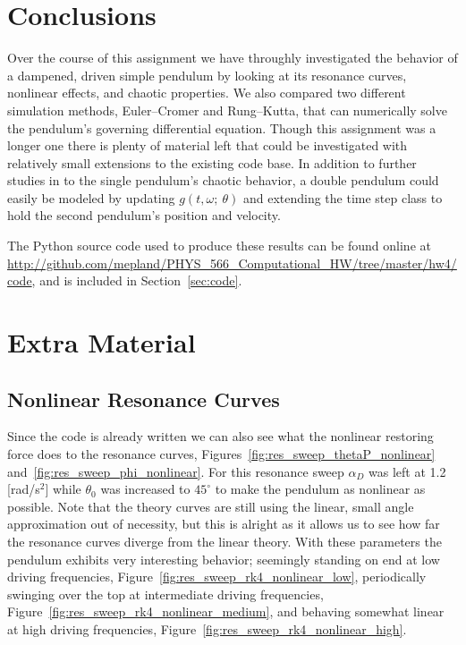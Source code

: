 \documentclass[notitlepage,aps,prd,nofootinbib]{revtex4-1}
\begin{document}
\clearpage
\section{Conclusions}
\label{sec:Conclusions}
Over the course of this assignment we have throughly investigated the behavior of a dampened, driven simple pendulum by looking at its resonance curves, nonlinear effects, and chaotic properties. We also compared two different simulation methods, Euler--Cromer and Rung--Kutta, that can numerically solve the pendulum's governing differential equation. Though this assignment was a longer one there is plenty of material left that could be investigated with relatively small extensions to the existing code base. In addition to further studies in to the single pendulum's chaotic behavior, a double pendulum could easily be modeled by updating $g\left(t, \omega;~\theta\right)$ and extending the time step class to hold the second pendulum's position and velocity.

The Python source code used to produce these results can be found online at \url{http://github.com/mepland/PHYS_566_Computational_HW/tree/master/hw4/code}, and is included in Section~\ref{sec:code}.

\clearpage
\section{Extra Material}
\label{sec:Extra_Material}

\subsection{Nonlinear Resonance Curves}
\label{subsec:nonlinear_resonance}

Since the code is already written we can also see what the nonlinear restoring force does to the resonance curves, Figures~\ref{fig:res_sweep_thetaP_nonlinear} and~\ref{fig:res_sweep_phi_nonlinear}. For this resonance sweep $\alpha_{D}$ was left at 1.2 [rad/s$^2$] while $\theta_{0}$ was increased to $45^{\circ}$ to make the pendulum as nonlinear as possible. Note that the theory curves are still using the linear, small angle approximation out of necessity, but this is alright as it allows us to see how far the resonance curves diverge from the linear theory. With these parameters the pendulum exhibits very interesting behavior; seemingly standing on end at low driving frequencies, Figure~\ref{fig:res_sweep_rk4_nonlinear_low}, periodically swinging over the top at intermediate driving frequencies, Figure~\ref{fig:res_sweep_rk4_nonlinear_medium}, and behaving somewhat linear at high driving frequencies, Figure~\ref{fig:res_sweep_rk4_nonlinear_high}.
\end{document}

